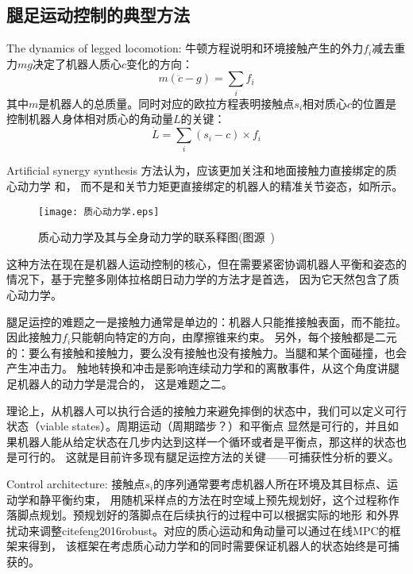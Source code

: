 \subsection{腿足运动控制的典型方法}

The dynamics of legged locomotion: 牛顿方程说明和环境接触产生的外力$f_i$减去重力$mg$决定了机器人质心$c$变化的方向：
\begin{equation}
    \label{equ:newton}
    m(\ddot{c}-g)=\sum_i f_i
\end{equation}
其中$m$是机器人的总质量。同时对应的欧拉方程表明接触点$s_i$相对质心$c$的位置是控制机器人身体相对质心的角动量$L$的关键：
\begin{equation}
    \label{equ:euler}
    \dot{L}=\sum_i\left(s_i-c\right) \times f_i
\end{equation}

Artificial synergy synthesis 方法认为，应该更加关注和地面接触力直接绑定的质心动力学
和，
而不是和关节力矩更直接绑定的机器人的精准关节姿态\cite{vukobratovic1972contribution}，如所示。
\begin{figure}[htbp]
    \centering
    \texttt{[image: 质心动力学.eps]}
    \caption{\label{fig:centroid}质心动力学及其与全身动力学的联系释图(图源~\cite{carpentier2016center})}
\end{figure}
这种方法在现在是机器人运动控制的核心，但在需要紧密协调机器人平衡和姿态的情况下，基于完整多刚体拉格朗日动力学的方法才是首选，
因为它天然包含了质心动力学\cite{orin2013centroidal}。

腿足运控的难题之一是接触力通常是单边的：机器人只能推接触表面，而不能拉。因此接触力$f_i$只能朝向特定的方向，由摩擦锥来约束。
另外，每个接触都是二元的：要么有接触和接触力，要么没有接触也没有接触力。当腿和某个面碰撞，也会产生冲击力。
触地转换和冲击是影响连续动力学和的离散事件，从这个角度讲腿足机器人的动力学是混合的，
这是难题之二。

理论上，从机器人可以执行合适的接触力来避免摔倒的状态中，我们可以定义可行状态（viable states）。周期运动（周期踏步？）和平衡点
显然是可行的，并且如果机器人能从给定状态在几步内达到这样一个循环或者是平衡点，那这样的状态也是可行的\cite{wieber2002stability}。
这就是目前许多现有腿足运控方法的关键\cite{wieber2016modeling}——可捕获性分析\cite{pratt2006velocity}的要义。

Control architecture: 接触点$s_i$的序列通常要考虑机器人所在环境及其目标点、运动学和静平衡约束\cite{escande2013planning}，
用随机采样点的方法在时空域上预先规划好，这个过程称作落脚点规划。预规划好的落脚点在后续执行的过程中可以根据实际的地形
和外界扰动来调整cite{feng2016robust}。对应的质心运动和角动量可以通过在线MPC的框架来得到\cite{wieber2006trajectory}，
该框架在考虑质心动力学和的同时需要保证机器人的状态始终是可捕获的\cite{wieber2016modeling}。

